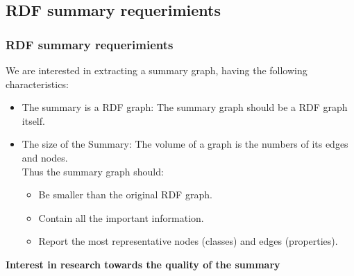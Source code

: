 \documentclass{beamer}
\numberwithin{figure}{section}
\numberwithin{equation}{section}
\begin{document}

\subsection{RDF summary requerimients}
\begin{frame} 
 \frametitle{RDF summary requerimients}
 \normalsize We are interested in extracting a summary graph, having the following characteristics:
 \vspace{5mm}
  \begin{itemize} \scriptsize
  	\item \justify The summary is a RDF graph: The summary graph should be a RDF graph itself.
    \vspace{2mm}
  	\item \justify The size of the Summary: The volume of a graph is the numbers of its edges and nodes.   
    		\\Thus the summary graph should:
    \vspace{2mm}
  		\begin{itemize}	\scriptsize
    		\item \justify Be smaller than the original RDF graph.
    		\vspace{2mm}
    		\item Contain all the important information.
            \vspace{2mm}
  			\item Report the most representative nodes (classes) and edges (properties).
 		\end{itemize}
  \end{itemize}

\centering 
\vspace{5 mm}\normalsize
\textbf{Interest in research towards the quality of the summary\cite{Khatchadourian2010}\cite{Zneika2018}}
 
\end{frame}
\end{document}
